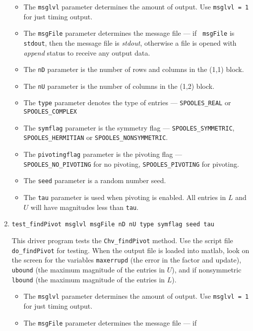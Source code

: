 \begin{enumerate}
\par
\begin{itemize}
\item
The {\tt msglvl} parameter determines the amount of output.
Use {\tt msglvl = 1} for just timing output.
\item
The {\tt msgFile} parameter determines the message file --- if {\tt
msgFile} is {\tt stdout}, then the message file is {\it stdout},
otherwise a file is opened with {\it append} status to receive any
output data.
\item
The {\tt nD} parameter is the number of rows and columns 
in the (1,1) block.
\item
The {\tt nU} parameter is the number of columns 
in the (1,2) block.
\item
The {\tt type} parameter denotes the type of entries ---
{\tt SPOOLES\_REAL} or {\tt SPOOLES\_COMPLEX} 
\item
The {\tt symflag} parameter is the symmetry flag ---
{\tt SPOOLES\_SYMMETRIC}, {\tt SPOOLES\_HERMITIAN}
or {\tt SPOOLES\_NONSYMMETRIC}.
\item
The {\tt pivotingflag} parameter is the pivoting flag ---
{\tt SPOOLES\_NO\_PIVOTING} for no pivoting,
{\tt SPOOLES\_PIVOTING} for pivoting.
\item
The {\tt seed} parameter is a random number seed.
\item
The {\tt tau} parameter is used when pivoting is enabled.
All entries in $L$ and $U$ will have magnitudes less than {\tt tau}.
\end{itemize}
\item
\begin{verbatim}
test_findPivot msglvl msgFile nD nU type symflag seed tau
\end{verbatim}
This driver program tests the {\tt Chv\_findPivot} method.
Use the script file {\tt do\_findPivot} for testing.
When the output file is loaded into matlab,
look on the screen for the variables
{\tt maxerrupd} (the error in the factor and update),
{\tt ubound} (the maximum magnitude of the entries in $U$),
and if nonsymmetric
{\tt lbound} (the maximum magnitude of the entries in $L$).
\par
\begin{itemize}
\item
The {\tt msglvl} parameter determines the amount of output.
Use {\tt msglvl = 1} for just timing output.
\item
The {\tt msgFile} parameter determines the message file --- if {\tt
}
\end{itemize}
\end{enumerate}
